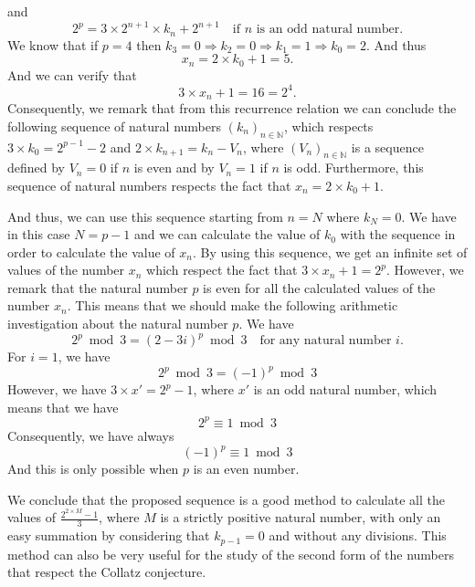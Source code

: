 \documentclass[11pt,a4paper]{article}
\newcommand{\N}{\mathbb{N}}
\theoremstyle{definition}
\begin{document}
and
\begin{equation}
2^{p}=3\times 2^{n+1}\times k_n+2^{n+1}\quad\text{if }n\text{ is an odd natural number.}
\end{equation}
We know that if $p=4$ then $k_3=0\Rightarrow k_2=0\Rightarrow k_1=1\Rightarrow k_0=2$. And
thus
\begin{equation}
x_n=2\times k_0+1=5.
\end{equation}
And we can verify that
\begin{equation}
3\times x_n+1=16=2^{4}.
\end{equation}
Consequently, we remark that from this recurrence relation we can conclude the following
sequence of natural numbers $(k_n)_{n\in\N}$, which respects
$3\times k_0=2^{p-1}-2$ and $2\times k_{n+1}=k_n-V_n$, where $(V_n)_{n\in\N}$ is a sequence
defined by $V_n=0$ if $n$ is even and by $V_n=1$ if $n$ is odd. Furthermore, this sequence
of natural numbers respects the fact that $x_n=2\times k_0+1$.

And thus, we can use this sequence starting from $n=N$ where $k_N=0$. We have in this case
$N=p-1$ and we can calculate the value of $k_0$ with the sequence in order to calculate the
value of $x_n$. By using this sequence, we get an infinite set of values of the number $x_n$
which respect the fact that $3\times x_n+1=2^{p}$. However, we remark that the natural number
$p$ is even for all the calculated values of the number $x_n$. This means that we should make
the following arithmetic investigation about the natural number $p$. We have
\begin{equation}
2^{p}\bmod 3=(2-3i)^{p}\bmod 3\quad\text{for any natural number }i.
\end{equation}
For $i=1$, we have
\begin{equation}
2^{p}\bmod 3=(-1)^{p}\bmod 3
\end{equation}
However, we have $3\times x'=2^{p}-1$, where $x'$ is an odd natural number, which means that
we have
\begin{equation}
2^{p}\equiv 1\bmod 3
\end{equation}
Consequently, we have always
\begin{equation}
(-1)^{p}\equiv 1\bmod 3
\end{equation}
And this is only possible when $p$ is an even number.

We conclude that the proposed sequence is a good method to calculate all the values of
$\frac{2^{2\times M}-1}{3}$, where $M$ is a strictly positive natural number, with only an
easy summation by considering that $k_{p-1}=0$ and without any divisions. This method can
also be very useful for the study of the second form of the numbers that respect the Collatz
conjecture.
\end{document}
